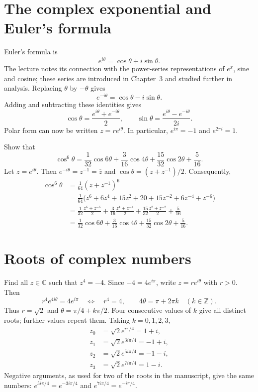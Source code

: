 \section{The complex exponential and Euler's formula}

Euler's formula is
\[
 \boxed{e^{i\theta}=\cos\theta+i\sin\theta}.
\]
The lecture notes its connection with the power-series representations of
$e^x$, sine and cosine; these series are introduced in Chapter~3 and studied
further in analysis. Replacing $\theta$ by $-\theta$ gives
\[
 e^{-i\theta}=\cos\theta-i\sin\theta.
\]
Adding and subtracting these identities gives
\[
 \boxed{\cos\theta=\frac{e^{i\theta}+e^{-i\theta}}2},
 \qquad
 \boxed{\sin\theta=\frac{e^{i\theta}-e^{-i\theta}}{2i}}.
\]
Polar form can now be written $z=re^{i\theta}$.
In particular, $e^{i\pi}=-1$ and $e^{2\pi i}=1$.

\begin{example}
Show that
\[
 \cos^6\theta=\frac1{32}\cos6\theta+\frac3{16}\cos4\theta
 +\frac{15}{32}\cos2\theta+\frac5{16}.
\]
Let $z=e^{i\theta}$. Then $e^{-i\theta}=z^{-1}=\overline z$ and
$\cos\theta=(z+z^{-1})/2$. Consequently,
\begin{align*}
 \cos^6\theta
 &=\frac1{64}(z+z^{-1})^6\\
 &=\frac1{64}\bigl(z^6+6z^4+15z^2+20+15z^{-2}+6z^{-4}+z^{-6}\bigr)\\
 &=\frac1{32}\frac{z^6+z^{-6}}2
 +\frac3{16}\frac{z^4+z^{-4}}2
 +\frac{15}{32}\frac{z^2+z^{-2}}2+\frac5{16}\\
 &=\frac1{32}\cos6\theta+\frac3{16}\cos4\theta
 +\frac{15}{32}\cos2\theta+\frac5{16}.
\end{align*}
\end{example}

\section{Roots of complex numbers}

\begin{example}
Find all $z\in\mathbb C$ such that $z^4=-4$.
Since $-4=4e^{i\pi}$, write $z=re^{i\theta}$ with $r>0$.
Then
\[
 r^4e^{4i\theta}=4e^{i\pi}
 \quad\Longleftrightarrow\quad
 r^4=4,\qquad4\theta=\pi+2\pi k\quad(k\in\mathbb Z).
\]
Thus $r=\sqrt2$ and $\theta=\pi/4+k\pi/2$. Four consecutive values of $k$
give all distinct roots; further values repeat them. Taking $k=0,1,2,3$,
\begin{align*}
 z_0&=\sqrt2 e^{i\pi/4}=1+i,\\
 z_1&=\sqrt2 e^{3i\pi/4}=-1+i,\\
 z_2&=\sqrt2 e^{5i\pi/4}=-1-i,\\
 z_3&=\sqrt2 e^{7i\pi/4}=1-i.
\end{align*}
Negative arguments, as used for two of the roots in the manuscript, give the
same numbers: $e^{5i\pi/4}=e^{-3i\pi/4}$ and
$e^{7i\pi/4}=e^{-i\pi/4}$.
\end{example}

